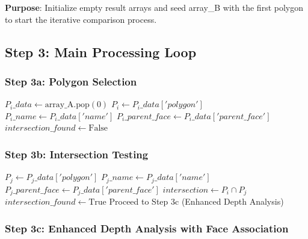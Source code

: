 \documentclass[12pt,a4paper]{article}
\begin{document}
\textbf{Purpose}: Initialize empty result arrays and seed array\_B with the first polygon to start the iterative comparison process.

\subsection{Step 3: Main Processing Loop}

\subsubsection{Step 3a: Polygon Selection}

\begin{algorithm}
\caption{Main Processing Loop}
\begin{algorithmic}[1]
    \STATE $P_i\_data \leftarrow \text{array\_A.pop}(0)$
    \STATE $P_i \leftarrow P_i\_data['polygon']$
    \STATE $P_i\_name \leftarrow P_i\_data['name']$
    \STATE $P_i\_parent\_face \leftarrow P_i\_data['parent\_face']$
    \STATE $intersection\_found \leftarrow \text{False}$
\end{algorithmic}
\end{algorithm}

\subsubsection{Step 3b: Intersection Testing}

\begin{algorithm}
\caption{Intersection Testing Against array\_B}
\begin{algorithmic}[1]
    \STATE $P_j \leftarrow P_j\_data['polygon']$
    \STATE $P_j\_name \leftarrow P_j\_data['name']$
    \STATE $P_j\_parent\_face \leftarrow P_j\_data['parent\_face']$
    \STATE $intersection \leftarrow P_i \cap P_j$
        \STATE $intersection\_found \leftarrow \text{True}$
        \STATE Proceed to Step 3c (Enhanced Depth Analysis)
    \ENDIF
\ENDFOR
\end{algorithmic}
\end{algorithm}

\subsubsection{Step 3c: Enhanced Depth Analysis with Face Association}
\end{document}
